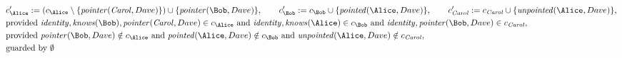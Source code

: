 \begin{align*}
&
c'_
{
\Alice
}
 := 
(c_
{
\Alice
}
 \setminus 
\{
\mathit{\detokenize{
pointer
}}
(
\mathit{Carol}
,
Dave
)
\}
) \cup 
\{
\mathit{\detokenize{
pointer
}}
(
\Bob
,
Dave
)
\}
, \qquad 
c'_
{
\Bob
}
 := 
c_
{
\Bob
}
 \cup 
\{
\mathit{\detokenize{
pointed
}}
(
\Alice
,
Dave
)
\}
, \qquad 
c'_
{
\mathit{Carol}
}
 := 
c_
{
\mathit{Carol}
}
 \cup 
\{
\mathit{\detokenize{
unpointed
}}
(
\Alice
,
Dave
)
\}
,\\
&
\text{provided } 
\mathit{\detokenize{
identity
}}
,
\mathit{\detokenize{
knows
}}
(
\Bob
)
,
\mathit{\detokenize{
pointer
}}
(
\mathit{Carol}
,
Dave
)
 \in c_
{
\Alice
}
 \text{ and } 
\mathit{\detokenize{
identity
}}
,
\mathit{\detokenize{
knows
}}
(
\Alice
)
 \in c_
{
\Bob
}
 \text{ and } 
\mathit{\detokenize{
identity
}}
,
\mathit{\detokenize{
pointer
}}
(
\Bob
,
Dave
)
 \in c_
{
\mathit{Carol}
}
,\\
&
\text{provided } 
\mathit{\detokenize{
pointer
}}
(
\Bob
,
Dave
)
 \notin c_
{
\Alice
}
 \text{ and } 
\mathit{\detokenize{
pointed
}}
(
\Alice
,
Dave
)
 \notin c_
{
\Bob
}
 \text{ and } 
\mathit{\detokenize{
unpointed
}}
(
\Alice
,
Dave
)
 \notin c_
{
\mathit{Carol}
}
,\\
&
\text{guarded by } \emptyset
\end{align*}
